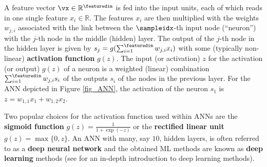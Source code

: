 \documentclass[12pt]{report}
\begin{document}
A feature vector $\vx \in \mathbb{R}^{\featuredim}$ is fed into the input units, 
each of which reads in one single feature $x_{i} \in \mathbb{R}$. The features 
$x_{i}$ are then multiplied with the weights $w_{j,i}$ associated with the link 
between the $\sampleidx$-th input node (``neuron'') with the $j$-th node 
in the middle (hidden) layer. The output of the $j$-th node in the hidden layer 
is given by $s_{j} = g( \sum_{i=1}^{\featuredim} w_{j,i} x_{i} )$ with some 
(typically non-linear) {\bf activation function} $g(z)$. The input (or activation) 
$z$ for the activation (or output) $g(z)$ of a neuron is a weighted 
(linear) combination $ \sum_{i=1}^{\featuredim} w_{j,i} s_{i}$ of the outputs $s_{i}$ of the nodes in the previous layer. For 
the ANN depicted in Figure \ref{fig_ANN}, the activation of the neuron $s_{1}$ is $z=w_{1,1}x_{1} + w_{1,2}x_{2}$.

Two popular choices for the activation function used within ANNs 
are the {\bf sigmoid function} $g(z) = \frac{1}{1+\exp(-z)}$ or the 
{\bf rectified linear unit} $g(z) = \max\{0,z\}$. An ANN with many, 
say $10$, hidden layers, is often referred to as a {\bf deep neural network} 
and the obtained ML methods are known as {\bf deep learning} methods (see \cite{Goodfellow-et-al-2016} for an in-depth 
introduction to deep learning methods). 
\end{document}
